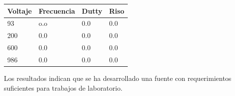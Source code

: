 \begin{table}[H]
\begin{tabular}{@{}llll@{}}
\toprule
Voltaje   & Frecuencia & Dutty & Riso \\ \midrule
93  & o.o        & 0.0   &  0.0\\
200 & 0.0        & 0.0   &   0.0\\
600 & 0.0        & 0.0   &   0.0\\
986 & 0.0        & 0.0   &   0.0\\ \bottomrule
\end{tabular}
\end{table}

Los resultados indican que se ha desarrollado una fuente con requerimientos suficientes para trabajos de laboratorio. 